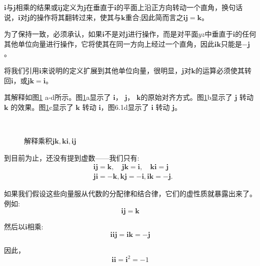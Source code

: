 \begin{CJK}{UTF8}{gkai}
    $\mathbf{i}$与$\mathbf{j}$相乘的结果或$\mathbf{ij}$定义为$\mathbf{j}$在垂直于$\mathbf{i}$的平面上沿正方向转动一个直角，换句话说，$\mathbf{i}$对$\mathbf{j}$的操作将其翻转过来，使其与$\mathbf{k}$重合;因此简而言之$\mathbf{i} \mathbf{j}=\mathbf{k}$。

    为了保持一致，必须承认，如果$\mathbf{i}$不是对$\mathbf{j}$进行操作，而是对平面$y z$中垂直于$\mathbf{i}$的任何其他单位向量进行操作，它将使其在同一方向上经过一个直角，因此$\mathbf{i k}$只能是$-\mathbf{j}$。

    将我们引用$\mathbf{i}$来说明的定义扩展到其他单位向量，很明显，$\mathbf{j}$对$\mathbf{k}$的运算必须使其转回$\mathbf{i}$，或$\mathbf{j} \mathbf{k}=\mathbf{i}$。\cite{bib6-4}
\end{CJK}

其解释如图\ref{fig:6-1} a-d所示。图\ref{fig:6-1}a显示了 $\mathbf{i}$， $\mathbf{j}$， $\mathbf{k}$的原始对齐方式。图\ref{fig:6-1}b显示了 $\mathbf{j}$ 转动 $\mathbf{k}$ 的效果。图\ref{fig:6-1}c显示了 $\mathbf{k}$ 转动 $\mathbf{i}$，图6.1d显示了 $\mathbf{i}$ 转动 $\mathbf{j}$。

\begin{figure}[htbp]
    \centering
    \\
    \caption[short]{ 解释乘积$\mathbf{j k,  ki, ij}$}
    \label{fig:6-1}
\end{figure}


到目前为止，还没有提到虚数——我们只有:
$$
    \begin{aligned}
         & \mathbf{i j}=\mathbf{k}, \quad \mathbf{j k}=\mathbf{i}, \quad \mathbf{k i}=\mathbf{j} \\
         & \mathbf{j i}=-\mathbf{k}, \mathbf{k j}=-\mathbf{i}, \mathbf{i k}=-\mathbf{j} .
    \end{aligned}
$$

如果我们假设这些向量服从代数的分配律和结合律，它们的虚性质就暴露出来了。例如:
$$
    \mathbf{i j}=\mathbf{k}
$$

然后以$\mathbf{i}$相乘:
$$
    \mathbf{i i j}=\mathbf{i k}=-\mathbf{j}
$$

因此，
$$
    \mathbf{i i}=\mathbf{i}^{2}=-1
$$

